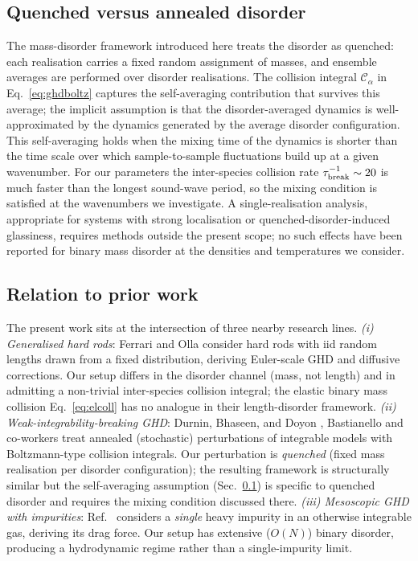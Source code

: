 \documentclass[aps,pre,twocolumn,superscriptaddress,longbibliography,floatfix]{revtex4-2}
\begin{document}
\subsection{Quenched versus annealed disorder}
\label{sec:quenched-vs-annealed-disorder}

The mass-disorder framework introduced here treats the disorder
as quenched: each realisation carries a fixed random assignment
of masses, and ensemble averages are performed over disorder
realisations. The collision integral $\mathcal{C}_\alpha$ in
Eq.~\eqref{eq:ghdboltz} captures the self-averaging contribution
that survives this average; the implicit assumption is that
the disorder-averaged dynamics is well-approximated by the
dynamics generated by the average disorder configuration. This
self-averaging holds when the mixing time of the dynamics is
shorter than the time scale over which sample-to-sample
fluctuations build up at a given wavenumber. For our parameters
the inter-species collision rate $\tau_{\rm break}^{-1}\sim 20$
is much faster than the longest sound-wave period, so the
mixing condition is satisfied at the wavenumbers we
investigate. A single-realisation analysis, appropriate for
systems with strong localisation or quenched-disorder-induced
glassiness, requires methods outside the present scope; no such
effects have been reported for binary mass disorder at the
densities and temperatures we consider.

\subsection{Relation to prior work}

The present work sits at the intersection of three nearby
research lines. \emph{(i) Generalised hard rods}: Ferrari and
Olla \cite{HRDiffusive2023} consider hard rods with iid random
lengths drawn from a fixed distribution, deriving Euler-scale
GHD and diffusive corrections. Our setup differs in the
disorder channel (mass, not length) and in admitting a
non-trivial inter-species collision integral; the elastic
binary mass collision Eq.~\eqref{eq:elcoll} has no analogue in
their length-disorder framework.
\emph{(ii) Weak-integrability-breaking GHD}: Durnin, Bhaseen,
and Doyon \cite{DurninDoyon2021}, Bastianello and co-workers
\cite{WeakBreaking2023,BastianelloBoltzmann2020} treat
annealed (stochastic) perturbations of integrable models with
Boltzmann-type collision integrals. Our perturbation is
\emph{quenched} (fixed mass realisation per disorder
configuration); the resulting framework is structurally
similar but the self-averaging assumption
(Sec.~\ref{sec:quenched-vs-annealed-disorder}) is specific to
quenched disorder and requires the mixing condition discussed
there.
\emph{(iii) Mesoscopic GHD with impurities}: Ref.~\cite{
MesoscopicImpurities2023} considers a \emph{single} heavy
impurity in an otherwise integrable gas, deriving its drag
force. Our setup has extensive ($O(N)$) binary disorder,
producing a hydrodynamic regime rather than a single-impurity
limit.
\end{document}

